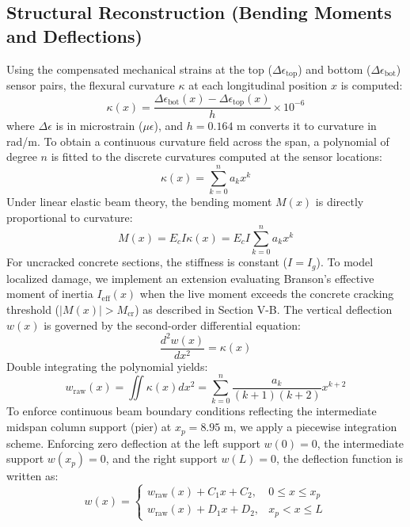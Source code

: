 \documentclass[11pt,journal,onecolumn]{IEEEtran}
\begin{document}
\subsection{Structural Reconstruction (Bending Moments and Deflections)}
Using the compensated mechanical strains at the top ($\Delta\epsilon_{\text{top}}$) and bottom ($\Delta\epsilon_{\text{bot}}$) sensor pairs, the flexural curvature $\kappa$ at each longitudinal position $x$ is computed:
\begin{equation}
    \kappa(x) = \frac{\Delta\epsilon_{\text{bot}}(x) - \Delta\epsilon_{\text{top}}(x)}{h} \times 10^{-6}
\end{equation}
where $\Delta\epsilon$ is in microstrain ($\mu\epsilon$), and $h = 0.164$ m converts it to curvature in rad/m.
To obtain a continuous curvature field across the span, a polynomial of degree $n$ is fitted to the discrete curvatures computed at the sensor locations:
\begin{equation}
    \kappa(x) = \sum_{k=0}^n a_k x^k
\end{equation}
Under linear elastic beam theory, the bending moment $M(x)$ is directly proportional to curvature:
\begin{equation}
    M(x) = E_c I \kappa(x) = E_c I \sum_{k=0}^n a_k x^k
\end{equation}
For uncracked concrete sections, the stiffness is constant ($I = I_g$). To model localized damage, we implement an extension evaluating Branson's effective moment of inertia $I_{\text{eff}}(x)$ when the live moment exceeds the concrete cracking threshold ($|M(x)| > M_{\text{cr}}$) as described in Section V-B.
The vertical deflection $w(x)$ is governed by the second-order differential equation:
\begin{equation}
    \frac{d^2w(x)}{dx^2} = \kappa(x)
\end{equation}
Double integrating the polynomial yields:
\begin{equation}
    w_{\text{raw}}(x) = \iint \kappa(x) dx^2 = \sum_{k=0}^n \frac{a_k}{(k+1)(k+2)} x^{k+2}
\end{equation}
To enforce continuous beam boundary conditions reflecting the intermediate midspan column support (pier) at $x_p = 8.95$ m, we apply a piecewise integration scheme. Enforcing zero deflection at the left support $w(0) = 0$, the intermediate support $w(x_p) = 0$, and the right support $w(L) = 0$, the deflection function is written as:
\begin{equation}
    w(x) = 
    \begin{cases} 
      w_{\text{raw}}(x) + C_1 x + C_2, & 0 \le x \le x_p \\
      w_{\text{raw}}(x) + D_1 x + D_2, & x_p < x \le L
    \end{cases}
\end{equation}
\end{document}
